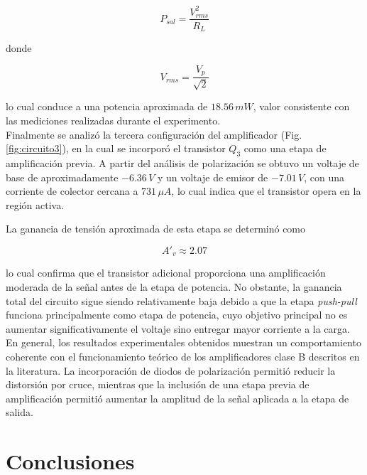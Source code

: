 \documentclass[journal]{IEEEtran}
\begin{document}
\[
P_{sal} = \frac{V_{rms}^2}{R_L}
\]

donde

\[
V_{rms} = \frac{V_p}{\sqrt{2}}
\]

lo cual conduce a una potencia aproximada de $18.56\,mW$, valor consistente con las mediciones realizadas durante el experimento. \\

Finalmente se analizó la tercera configuración del amplificador (Fig.\ref{fig:circuito3}), en la cual se incorporó el transistor $Q_3$ como una etapa de amplificación previa. A partir del análisis de polarización se obtuvo un voltaje de base de aproximadamente $-6.36\,V$ y un voltaje de emisor de $-7.01\,V$, con una corriente de colector cercana a $731\,\mu A$, lo cual indica que el transistor opera en la región activa.

La ganancia de tensión aproximada de esta etapa se determinó como

\[
A'_v \approx 2.07
\]

lo cual confirma que el transistor adicional proporciona una amplificación moderada de la señal antes de la etapa de potencia. No obstante, la ganancia total del circuito sigue siendo relativamente baja debido a que la etapa  \textit{push-pull} funciona principalmente como etapa de potencia, cuyo objetivo principal no es aumentar significativamente el voltaje sino entregar mayor corriente a la carga.\cite{Floyd2008}\\

En general, los resultados experimentales obtenidos muestran un comportamiento coherente con el funcionamiento teórico de los amplificadores clase B descritos en la literatura. La incorporación de diodos de polarización permitió reducir la distorsión por cruce, mientras que la inclusión de una etapa previa de amplificación permitió aumentar la amplitud de la señal aplicada a la etapa de salida.


\section{Conclusiones}
\end{document}

